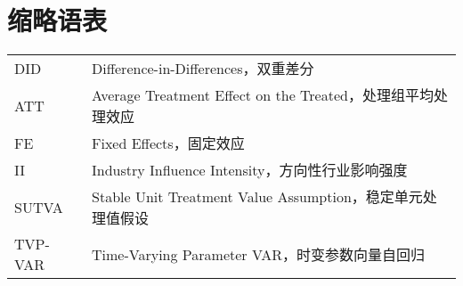 \chapter*{缩略语表}
\begin{tabular}{lp{10cm}}
DID & Difference-in-Differences，双重差分 \\
ATT & Average Treatment Effect on the Treated，处理组平均处理效应 \\
FE & Fixed Effects，固定效应 \\
II & Industry Influence Intensity，方向性行业影响强度 \\
SUTVA & Stable Unit Treatment Value Assumption，稳定单元处理值假设 \\
TVP-VAR & Time-Varying Parameter VAR，时变参数向量自回归 \\
\end{tabular}
